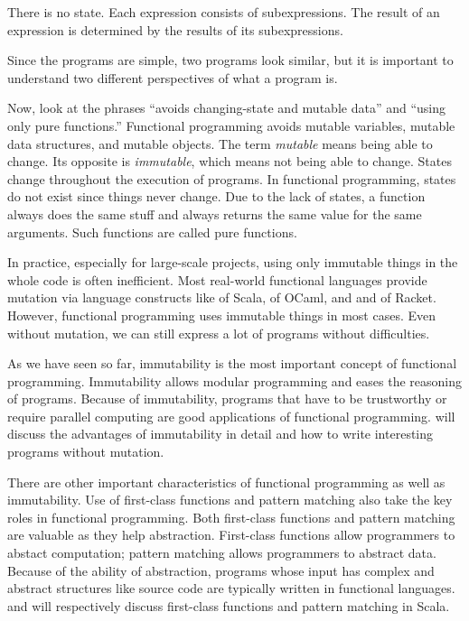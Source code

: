 There is no state. Each expression consists of subexpressions. The result of
an expression is determined by the results of its subexpressions.

Since the programs are simple, two programs look similar, but it is important to
understand two different perspectives of what a program is.

Now, look at the phrases ``avoids changing-state and mutable data'' and ``using
only pure functions.'' Functional programming avoids mutable variables, mutable data
structures, and mutable objects. The term \textit{mutable}
means being able to change. Its opposite is \textit{immutable},
which means not being able to change. States change throughout the execution of programs.
In functional programming, states do not exist since things never change.
Due to the lack of states, a function always does the same stuff
and always returns the same value for the same arguments. Such functions
are called pure functions.

In practice, especially for large-scale projects, using only immutable things in
the whole code is often inefficient. Most real-world functional languages
provide mutation via language constructs like  of Scala,  of
OCaml, and  and  of Racket. However,
functional programming uses immutable things in most cases. Even without
mutation, we can still express a lot of programs without difficulties.

As we have seen so far,
immutability is the most important concept of functional programming.
Immutability allows modular programming and eases the reasoning of programs.
Because of immutability, programs that have to be trustworthy or require parallel computing
are good applications of functional programming.
 will discuss the advantages of immutability in detail and
how to write interesting programs without mutation.

There are other important characteristics of functional programming as well as
immutability. Use of first-class functions and pattern matching also take the
key roles in functional programming. Both first-class functions and pattern matching
are valuable as they help abstraction. First-class functions allow programmers
to abstact computation; pattern matching allows programmers to abstract
data. Because of the ability of abstraction,
programs whose input has complex and abstract structures like source code
are typically written in functional languages.
 and  will respectively discuss first-class
functions and pattern matching in Scala.

